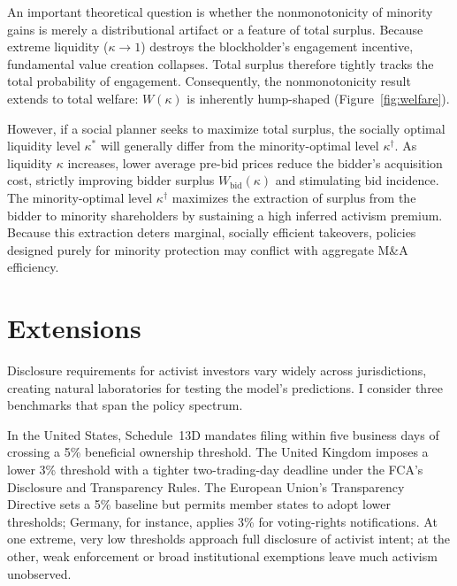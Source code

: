 \documentclass[11pt]{article}
\newcommand{\1}{\mathbf{1}}
\begin{document}
An important theoretical question is whether the nonmonotonicity of minority gains is merely a distributional artifact or a feature of total surplus. Because extreme liquidity ($\kappa \to 1$) destroys the blockholder's engagement incentive, fundamental value creation collapses. Total surplus therefore tightly tracks the total probability of engagement. Consequently, the nonmonotonicity result extends to total welfare: $W(\kappa)$ is inherently hump-shaped (Figure~\ref{fig:welfare}).

However, if a social planner seeks to maximize total surplus, the socially optimal liquidity level $\kappa^*$ will generally differ from the minority-optimal level $\kappa^\dagger$. As liquidity $\kappa$ increases, lower average pre-bid prices reduce the bidder's acquisition cost, strictly improving bidder surplus $W_{\text{bid}}(\kappa)$ and stimulating bid incidence. The minority-optimal level $\kappa^\dagger$ maximizes the extraction of surplus from the bidder to minority shareholders by sustaining a high inferred activism premium. Because this extraction deters marginal, socially efficient takeovers, policies designed purely for minority protection may conflict with aggregate M\&A efficiency.

\section{Extensions}
\label{sec:extensions}

Disclosure requirements for activist investors vary widely across jurisdictions, creating natural laboratories for testing the model's predictions. I consider three benchmarks that span the policy spectrum.

In the United States, Schedule~13D mandates filing within five business days of crossing a 5\% beneficial ownership threshold. The United Kingdom imposes a lower 3\% threshold with a tighter two-trading-day deadline under the FCA's Disclosure and Transparency Rules. The European Union's Transparency Directive sets a 5\% baseline but permits member states to adopt lower thresholds; Germany, for instance, applies 3\% for voting-rights notifications. At one extreme, very low thresholds approach full disclosure of activist intent; at the other, weak enforcement or broad institutional exemptions leave much activism unobserved.
\end{document}
